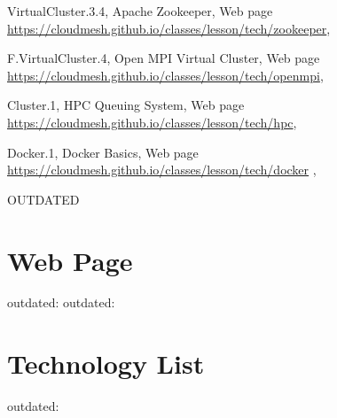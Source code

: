 VirtualCluster.3.4, Apache Zookeeper, Web page \url{https://cloudmesh.github.io/classes/lesson/tech/zookeeper}, 

F.VirtualCluster.4, Open MPI Virtual Cluster,  Web page \url{https://cloudmesh.github.io/classes/lesson/tech/openmpi},

Cluster.1, HPC Queuing System, Web page \url{https://cloudmesh.github.io/classes/lesson/tech/hpc},

Docker.1, Docker Basics, Web page \url{https://cloudmesh.github.io/classes/lesson/tech/docker} ,


OUTDATED

\section{Web Page}

outdated: 
outdated: 

\section{Technology List}

outdated: 

